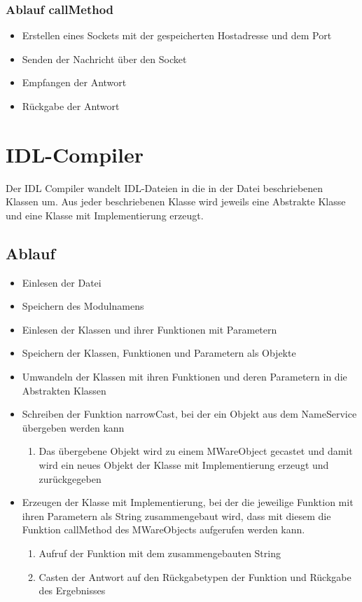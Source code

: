 \subsubsection{Ablauf callMethod}
\begin{itemize}
\item Erstellen eines Sockets mit der gespeicherten Hostadresse und dem Port
\item Senden der Nachricht über den Socket
\item Empfangen der Antwort
\item Rückgabe der Antwort
\end{itemize}

\section{IDL-Compiler}
Der IDL Compiler wandelt IDL-Dateien in die in der Datei beschriebenen Klassen um. Aus jeder beschriebenen Klasse wird jeweils eine Abstrakte Klasse und eine Klasse mit Implementierung erzeugt.

\subsection{Ablauf}
\begin{itemize}
\item Einlesen der Datei
\item Speichern des Modulnamens
\item Einlesen der Klassen und ihrer Funktionen mit Parametern
\item Speichern der Klassen, Funktionen und Parametern als Objekte
\item Umwandeln der Klassen mit ihren Funktionen und deren Parametern in die Abstrakten Klassen
\item Schreiben der Funktion narrowCast, bei der ein Objekt aus dem NameService übergeben werden kann
\begin{enumerate}
\item Das übergebene Objekt wird zu einem MWareObject gecastet und damit wird ein neues Objekt der Klasse mit Implementierung erzeugt und zurückgegeben
\end{enumerate}
\item Erzeugen der Klasse mit Implementierung, bei der die jeweilige Funktion mit ihren Parametern als String zusammengebaut wird, dass mit diesem die Funktion callMethod des MWareObjects aufgerufen werden kann.
\begin{enumerate}
\item Aufruf der Funktion mit dem zusammengebauten String
\item Casten der Antwort auf den Rückgabetypen der Funktion und Rückgabe des Ergebnisses
\end{enumerate}
\end{itemize}
